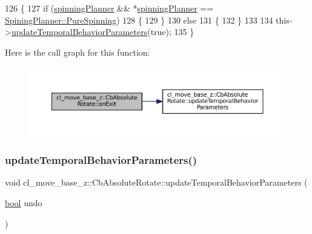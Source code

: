 \begin{DoxyCode}
126 \{
127   \textcolor{keywordflow}{if} (\hyperlink{classcl__move__base__z_1_1CbAbsoluteRotate_a17d836524599af072cf2e3488e491a91}{spinningPlanner} && *\hyperlink{classcl__move__base__z_1_1CbAbsoluteRotate_a17d836524599af072cf2e3488e491a91}{spinningPlanner} == 
      \hyperlink{namespacecl__move__base__z_aab2ad3041275145f0065fb60b3299345aada5274435681a4ce04175bebfa6652f}{SpiningPlanner::PureSpinning})
128   \{
129   \}
130   \textcolor{keywordflow}{else}
131   \{
132   \}
133 
134   this->\hyperlink{classcl__move__base__z_1_1CbAbsoluteRotate_a2d8a4200dcacc00ad60c22ad2af5d4b2}{updateTemporalBehaviorParameters}(\textcolor{keyword}{true});
135 \}
\end{DoxyCode}
Here is the call graph for this function\+:
\nopagebreak
\begin{figure}[H]
\begin{center}
\leavevmode
\includegraphics[width=350pt]{classcl__move__base__z_1_1CbAbsoluteRotate_a0e362b8e9f0d7de5aeee183ba4031437_cgraph}
\end{center}
\end{figure}
\mbox{\label{classcl__move__base__z_1_1CbAbsoluteRotate_a2d8a4200dcacc00ad60c22ad2af5d4b2}} 
\subsubsection{\texorpdfstring{update\+Temporal\+Behavior\+Parameters()}{updateTemporalBehaviorParameters()}}
{\footnotesize\ttfamily void cl\+\_\+move\+\_\+base\+\_\+z\+::\+Cb\+Absolute\+Rotate\+::update\+Temporal\+Behavior\+Parameters (\begin{DoxyParamCaption}\item[{\hyperlink{classbool}{bool}}]{undo }\end{DoxyParamCaption})\hspace{0.3cm}{\ttfamily [private]}}




